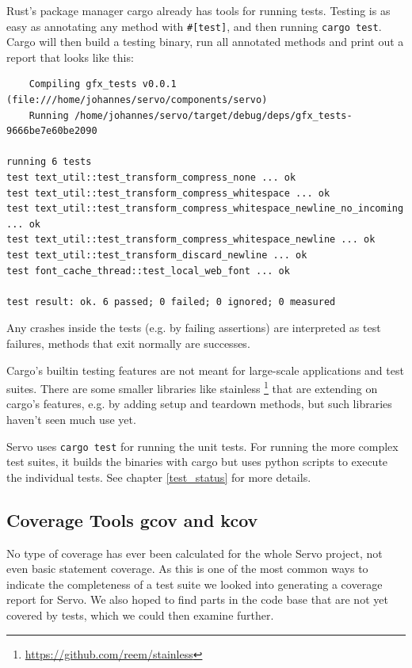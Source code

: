 \documentclass{scrartcl}
\begin{document}
Rust's package manager cargo already has tools for running tests. Testing is as easy as annotating any method with \texttt{\#[test]}, and then running \texttt{cargo test}. Cargo will then build a testing binary, run all annotated methods and print out a report that looks like this:


\small {

\begin{verbatim}
    Compiling gfx_tests v0.0.1 (file:///home/johannes/servo/components/servo)
    Running /home/johannes/servo/target/debug/deps/gfx_tests-9666be7e60be2090

running 6 tests
test text_util::test_transform_compress_none ... ok
test text_util::test_transform_compress_whitespace ... ok
test text_util::test_transform_compress_whitespace_newline_no_incoming ... ok
test text_util::test_transform_compress_whitespace_newline ... ok
test text_util::test_transform_discard_newline ... ok
test font_cache_thread::test_local_web_font ... ok

test result: ok. 6 passed; 0 failed; 0 ignored; 0 measured

\end{verbatim}
}

Any crashes inside the tests (e.g. by failing assertions) are interpreted as test failures, methods that exit normally are successes.

Cargo's builtin testing features are not meant for large-scale applications and test suites. There are some smaller libraries like stainless \footnote{\url{https://github.com/reem/stainless}} that are extending on cargo's features, e.g. by adding setup and teardown methods, but such libraries haven't seen much use yet. 

Servo uses \texttt{cargo test} for running the unit tests. For running the more complex test suites, it builds the binaries with cargo but uses python scripts to execute the individual tests. See chapter \ref{test_status} for more details.


\subsection{Coverage Tools gcov and kcov}

No type of coverage has ever been calculated for the whole Servo project, not even basic statement coverage. As this is one of the most common ways to indicate the completeness of a test suite we looked into generating a coverage report for Servo. We also hoped to find parts in the code base that are not yet covered by tests, which we could then examine further. 
\end{document}
